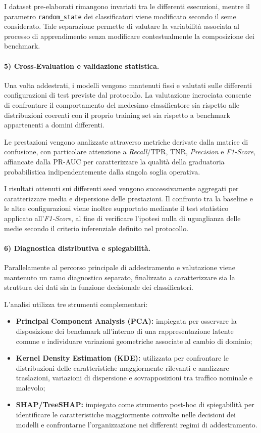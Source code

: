 I dataset pre-elaborati rimangono invariati tra le differenti esecuzioni, mentre il parametro \texttt{random\_state} dei classificatori viene modificato secondo il seme considerato. 
Tale separazione permette di valutare la variabilità associata al processo di apprendimento senza modificare contestualmente la composizione dei benchmark.

\paragraph{5) Cross-Evaluation e validazione statistica.}
Una volta addestrati, i modelli vengono mantenuti fissi e valutati sulle differenti configurazioni di test previste dal protocollo. 
La valutazione incrociata consente di confrontare il comportamento del medesimo classificatore sia rispetto alle distribuzioni coerenti con il proprio training set sia rispetto a benchmark appartenenti a domini differenti.

Le prestazioni vengono analizzate attraverso metriche derivate dalla matrice di confusione, con particolare attenzione a \textit{Recall}/TPR, TNR, \textit{Precision} e \textit{F1-Score}, affiancate dalla PR-AUC per caratterizzare la qualità della graduatoria probabilistica indipendentemente dalla singola soglia operativa.

I risultati ottenuti sui differenti seed vengono successivamente aggregati per caratterizzare media e dispersione delle prestazioni. 
Il confronto tra la baseline e le altre configurazioni viene inoltre supportato mediante il test statistico applicato all'\textit{F1-Score}, al fine di verificare l'ipotesi nulla di uguaglianza delle medie secondo il criterio inferenziale definito nel protocollo.

\paragraph{6) Diagnostica distributiva e spiegabilità.}
Parallelamente al percorso principale di addestramento e valutazione viene mantenuto un ramo diagnostico separato, finalizzato a caratterizzare sia la struttura dei dati sia la funzione decisionale dei classificatori.

L'analisi utilizza tre strumenti complementari:
\begin{itemize}
    \item \textbf{Principal Component Analysis (PCA):} impiegata per osservare la disposizione dei benchmark all'interno di una rappresentazione latente comune e individuare variazioni geometriche associate al cambio di dominio;

    \item \textbf{Kernel Density Estimation (KDE):} utilizzata per confrontare le distribuzioni delle caratteristiche maggiormente rilevanti e analizzare traslazioni, variazioni di dispersione e sovrapposizioni tra traffico nominale e malevolo;

    \item \textbf{SHAP/TreeSHAP:} impiegato come strumento post-hoc di spiegabilità per identificare le caratteristiche maggiormente coinvolte nelle decisioni dei modelli e confrontarne l'organizzazione nei differenti regimi di addestramento.
\end{itemize}

